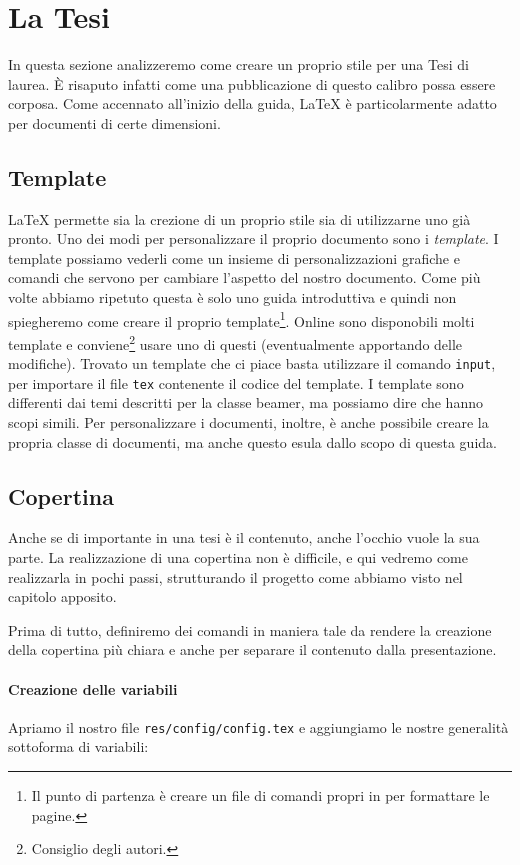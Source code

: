 \section{La Tesi}
In questa sezione analizzeremo come creare un proprio stile per una Tesi di
laurea. È risaputo infatti come una pubblicazione di questo calibro possa
essere corposa. Come accennato all'inizio della guida, \LaTeX{} è
particolarmente adatto per documenti di certe dimensioni.

\subsection{Template}
\LaTeX{} permette sia la crezione di un proprio stile sia di utilizzarne uno 
già pronto. Uno dei modi per personalizzare il proprio documento sono i\textit{
template}. I template possiamo vederli come un insieme di personalizzazioni 
grafiche e comandi che servono per cambiare l'aspetto del nostro documento. 
Come più volte abbiamo ripetuto questa è solo uno guida introduttiva e quindi 
non spiegheremo come creare il proprio template\footnote{Il punto di partenza 
è creare un file di comandi propri in per formattare le pagine.}. Online sono 
disponobili molti template e conviene\footnote{Consiglio degli autori.} usare 
uno di questi (eventualmente apportando delle modifiche). Trovato un template 
che ci piace basta utilizzare il comando \texttt{input}, per importare il file 
\texttt{tex} contenente il codice del template. I template sono differenti dai 
temi descritti per la classe beamer, ma possiamo dire che hanno scopi simili. 
Per personalizzare i documenti, inoltre, è anche possibile creare la propria 
classe di documenti, ma anche questo esula dallo scopo di questa guida.

\subsection{Copertina}
Anche se di importante in una tesi è il contenuto, anche l'occhio vuole la sua
parte. La realizzazione di una copertina non è difficile, e qui vedremo come
realizzarla in pochi passi, strutturando il progetto come abbiamo visto nel
capitolo apposito. %

Prima di tutto, definiremo dei comandi in maniera tale da rendere la creazione
della copertina più chiara e anche per separare il contenuto dalla
presentazione.

\paragraph*{Creazione delle variabili} Apriamo il nostro file
\texttt{res/config/config.tex} e aggiungiamo le nostre generalità sottoforma di
variabili:

